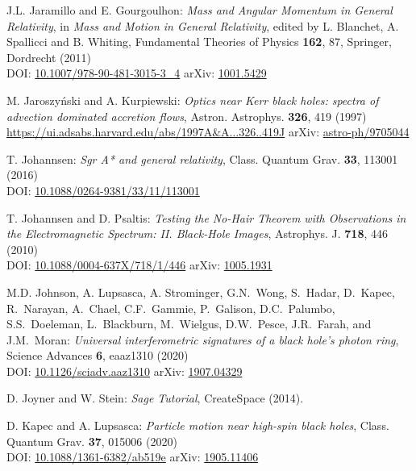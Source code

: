 \begin{thebibliography}{123}
J.L. Jaramillo and E. Gourgoulhon:
{\em Mass and Angular Momentum in General Relativity},
in \emph{Mass and Motion in General Relativity}, edited by L. Blanchet, A. Spallicci and B. Whiting, Fundamental Theories of Physics {\bf 162}, 87,
Springer, Dordrecht (2011) \\
DOI: \href{https://doi.org/10.1007/978-90-481-3015-3_4}{10.1007/978-90-481-3015-3\_4}\hfill
arXiv: \href{https://arxiv.org/abs/1001.5429}{1001.5429}

M. Jaroszy\'nski and A. Kurpiewski:
{\em Optics near Kerr black holes: spectra of advection dominated accretion flows},
Astron. Astrophys. {\bf 326}, 419 (1997)\\
\url{https://ui.adsabs.harvard.edu/abs/1997A&A...326..419J}\hfill
arXiv: \href{https://arxiv.org/abs/astro-ph/9705044}{astro-ph/9705044}

T. Johannsen:
{\em Sgr A* and general relativity},
Class. Quantum Grav.  {\bf 33}, 113001 (2016)\\
DOI: \href{https://doi.org/10.1088/0264-9381/33/11/113001}{10.1088/0264-9381/33/11/113001}

T. Johannsen and D. Psaltis:
{\em Testing the No-Hair Theorem with Observations in the Electromagnetic Spectrum: II. Black-Hole Images},
Astrophys. J. {\bf 718}, 446 (2010)\\
DOI: \href{https://doi.org/10.1088/0004-637X/718/1/446}{10.1088/0004-637X/718/1/446}\hfill
arXiv: \href{https://arxiv.org/abs/1005.1931}{1005.1931}

M.D. Johnson, A. Lupsasca, A. Strominger, G.N.~Wong, S.~Hadar, D.~Kapec, R.~Narayan, A.~Chael,
C.F.~Gammie, P.~Galison, D.C.~Palumbo, S.S.~Doeleman, L.~Blackburn, M.~Wielgus, D.W.~Pesce,
J.R.~Farah, and J.M.~Moran:
{\em Universal interferometric signatures of a black hole's photon ring},
Science Advances {\bf 6}, eaaz1310 (2020)\\
DOI: \href{https://doi.org/10.1126/sciadv.aaz1310}{10.1126/sciadv.aaz1310}\hfill
arXiv: \href{https://arxiv.org/abs/1907.04329}{1907.04329}

D. Joyner and W. Stein: {\em Sage Tutorial}, CreateSpace (2014).

D. Kapec and A. Lupsasca:
{\em Particle motion near high-spin black holes},
Class. Quantum Grav. {\bf 37}, 015006 (2020)\\
DOI: \href{https://doi.org/10.1088/1361-6382/ab519e}{10.1088/1361-6382/ab519e}\hfill
arXiv: \href{https://arxiv.org/abs/1905.11406}{1905.11406}


\end{thebibliography}
